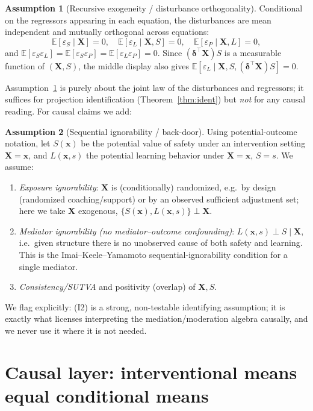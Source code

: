 \documentclass{amsart}
\theoremstyle{definition}
\newtheorem{assumption}{Assumption}
\theoremstyle{plain}
\begin{document}
\begin{assumption}[Recursive exogeneity / disturbance orthogonality]\label{ass:exog}
Conditional on the regressors appearing in each equation, the disturbances are mean
independent and mutually orthogonal across equations:
\[
\mathbb E[\varepsilon_S\mid \bm X]=0,\quad
\mathbb E[\varepsilon_L\mid \bm X,S]=0,\quad
\mathbb E[\varepsilon_P\mid \bm X,L]=0,
\]
and $\mathbb E[\varepsilon_S\varepsilon_L]=\mathbb E[\varepsilon_S\varepsilon_P]
=\mathbb E[\varepsilon_L\varepsilon_P]=0$. Since $(\bm\delta^\top\bm X)S$ is a measurable
function of $(\bm X,S)$, the middle display also gives
$\mathbb E[\varepsilon_L\mid \bm X,S,(\bm\delta^\top\bm X)S]=0$.
\end{assumption}

Assumption~\ref{ass:exog} is purely about the joint law of the disturbances and regressors;
it suffices for projection identification (Theorem~\ref{thm:ident}) but \emph{not} for any
causal reading. For causal claims we add:

\begin{assumption}[Sequential ignorability / back-door]\label{ass:ign}
Using potential-outcome notation, let $S(\bm x)$ be the potential value of safety under an
intervention setting $\bm X=\bm x$, and $L(\bm x,s)$ the potential learning behavior under
$\bm X=\bm x$, $S=s$. We assume:
\begin{enumerate}
\item[(I1)] \emph{Exposure ignorability}: $\bm X$ is (conditionally) randomized, e.g.\ by
design (randomized coaching/support) or by an observed sufficient adjustment set; here we take
$\bm X$ exogenous, $\{S(\bm x),L(\bm x,s)\}\perp \bm X$.
\item[(I2)] \emph{Mediator ignorability (no mediator--outcome confounding)}:
$L(\bm x,s)\perp S\mid \bm X$, i.e.\ given structure there is no unobserved cause of both
safety and learning. This is the Imai--Keele--Yamamoto sequential-ignorability condition for
a single mediator.
\item[(I3)] \emph{Consistency/SUTVA} and positivity (overlap) of $\bm X,S$.
\end{enumerate}
\end{assumption}

We flag explicitly: (I2) is a strong, non-testable identifying assumption; it is exactly
what licenses interpreting the mediation/moderation algebra causally, and we never use it
where it is not needed.

\section{Causal layer: interventional means equal conditional means}
\end{document}
